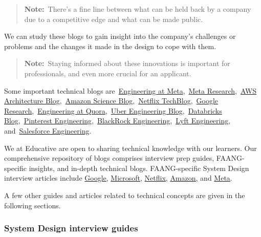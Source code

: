 \begin{quote}
\textbf{Note:}~There's a fine line between what can be held back by a company due to a competitive edge and what can be made public.
\end{quote}
We can study these blogs to gain insight into the company's challenges or problems and the changes it made in the design to cope with them.
\begin{quote}
\textbf{Note:}~Staying informed about these innovations is important for professionals, and even more crucial for an applicant.
\end{quote}
Some important technical blogs are~\href{https://engineering.fb.com/}{Engineering at Meta},~\href{https://research.fb.com/}{Meta Research},~\href{https://aws.amazon.com/blogs/architecture/}{AWS Architecture Blog},~\href{https://www.amazon.science/blog}{Amazon Science Blog},~\href{https://netflixtechblog.com/}{Netflix TechBlog},~\href{https://research.google/}{Google Research},~\href{https://quoraengineering.quora.com/}{Engineering at Quora},~\href{https://eng.uber.com/}{Uber Engineering Blog},~\href{https://databricks.com/blog/category/engineering}{Databricks Blog},~\href{https://medium.com/@Pinterest_Engineering}{Pinterest Engineering},~\href{https://medium.com/blackrock-engineering}{BlackRock Engineering},~\href{https://eng.lyft.com/}{Lyft Engineering}, and~\href{https://engineering.salesforce.com/}{Salesforce Engineering}.

We at Educative are open to sharing technical knowledge with our learners. Our comprehensive repository of blogs comprises interview prep guides, FAANG-specific insights, and in-depth technical blogs. FAANG-specific System Design interview articles include \href{https://www.educative.io/blog/google-system-design-interview-questions}{Google}, \href{https://www.educative.io/blog/microsoft-system-design-interview}{Microsoft,} \href{https://www.educative.io/blog/netflix-system-design-interview-questions}{Netflix,} \href{https://www.educative.io/blog/amazon-system-design-interview}{Amazon,} and \href{https://www.educative.io/blog/meta-system-design-interview}{Meta}.

A few other guides and articles related to technical concepts are given in the following sections.

\subsubsection{System Design interview guides}\label{AE9oW82se-gKKdMCDZXZp}


